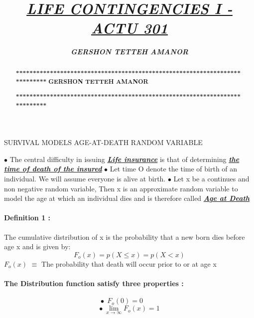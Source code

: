 \documentclass[]{report}
\title{\textbf{\textit{\underline{LIFE CONTINGENCIES I - ACTU 301}}}}
\author{\textbf{\textit{GERSHON TETTEH AMANOR}}}
\begin{document}
	\maketitle
  SURVIVAL MODELS \centering \newline
AGE-AT-DEATH RANDOM VARIABLE \centering

\begin{abstract}
\textbf{***************************************************************************}
\textbf{	GERSHON TETTEH AMANOR}

\textbf{***************************************************************************}
\end{abstract}
\begin{flushleft}

$\bullet$ The central difficulty in issuing \underline{\textbf{\textit{Life insurance}}} is that of determining \underline{\textbf{\textit{the time of death of the insured}}} \newline
$\bullet$ Let time O denote the time of birth of an individual. We will assume everyone is alive at birth. \newline
$\bullet$ Let x be a continues and non negative random variable, Then x is an approximate random variable to model the age at which an individual dies and is therefore called \underline{ \textbf{\textit{Age at Death}}} \newline
\newline
\paragraph{Definition 1 :}
The cumulative distribution of x is the probability that a new born dies before age x and is given by: \newline
$$F_o(x) = p(X \le x) = p(X<x)$$  \newline
$F_o(x)$ $\equiv$ The probability that death will occur prior to or at age x \\
\paragraph{The Distribution function satisfy three properties :}
$$\bullet\ \  F_o(0) = 0 \ \ \ \ \ \ \ \ \ \ $$  
$$\bullet\ \lim_{x \rightarrow \infty} F_o(x) = 1$$




\end{flushleft}
\end{document}
